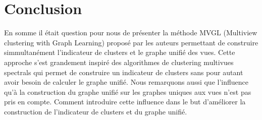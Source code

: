 \documentclass[12pt, french, latin.medieval, a4paper]{report}
\begin{document}
	\section{Conclusion}
	En somme il était question pour nous de présenter la méthode MVGL (Multiview clustering with Graph Learning) proposé par les auteurs permettant de construire simmultanément l'indicateur de clusters et le graphe unifié des vues. Cette approche s'est grandement inspiré des algorithmes de clustering multivues spectrals qui permet de construire un indicateur de clusters sans pour autant avoir besoin de calculer le graphe unifié. Nous remarquons aussi que l'influence qu'à la construction du graphe unifié sur les graphes uniques aux vues n'est pas pris en compte. Comment introduire cette influence dans le but d'améliorer la construction de l'indicateur de clusters et du graphe unifié.
   

    
\end{document}
